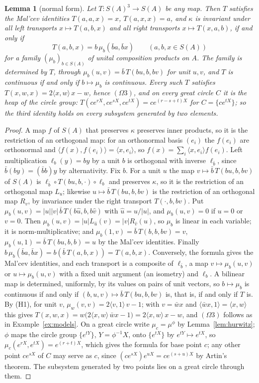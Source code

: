 \documentclass[11pt,reqno]{amsart}
\newtheorem{lemma}[theorem]{Lemma}
\theoremstyle{definition}
\theoremstyle{remark}
\numberwithin{equation}{section}
\newcommand{\ip}[2]{\langle #1,#2\rangle}
\begin{document}
\begin{lemma}[normal form]\label{lem:normal}
Let $T\colon S(A)^3\to S(A)$ be any map.  Then $T$ satisfies the Mal'cev identities $T(a,a,x)=x$, $T(a,x,x)=a$, and $\kappa$ is
invariant under all left transports $x\mapsto T(a,b,x)$ and all right transports $x\mapsto T(x,a,b)$, if and only if
\[
T(a,b,x)=b\,\mu_b(\bar ba,\bar bx)\qquad(a,b,x\in S(A))
\]
for a family $(\mu_b)_{b\in S(A)}$ of unital composition products on $A$.  The family is determined by $T$, through
$\mu_b(u,v)=\bar b\,T(bu,b,bv)$ for unit $u,v$, and $T$ is continuous if and only if $b\mapsto\mu_b$ is continuous.  Every such $T$
satisfies $T(x,w,x)=2\ip xw\,x-w$, hence $(\Omega3)$, and on every great circle $C$ it is the heap of the circle group:
$T(ce^{rX},ce^{sX},ce^{tX})=ce^{(r-s+t)X}$ for $C=\{ce^{tX}\}$; so the third identity holds on every subsystem generated by two
elements.
\end{lemma}
\begin{proof}
A map $f$ of $S(A)$ that preserves $\kappa$ preserves inner products, so it is the restriction of an orthogonal map: for an orthonormal
basis $(e_i)$ the $f(e_i)$ are orthonormal and $\ip{f(x)}{f(e_i)}=\ip x{e_i}$, so $f(x)=\sum_i\ip x{e_i}f(e_i)$.  Left multiplication
$\ell_b(y)=by$ by a unit $b$ is orthogonal with inverse $\ell_{\bar b}$, since $\bar b(by)=(\bar bb)y$ by alternativity.  Fix $b$.  For a unit $u$
the map $v\mapsto\bar b\,T(bu,b,bv)$ of $S(A)$ is $\ell_{\bar b}\circ T(bu,b,\cdot)\circ\ell_b$ and preserves $\kappa$, so it is the restriction of
an orthogonal map $L_u$; likewise $u\mapsto\bar b\,T(bu,b,bv)$ is the restriction of an orthogonal map $R_v$, by invariance under the
right transport $T(\cdot,b,bv)$.  Put $\mu_b(u,v)=\lvert u\rvert\lvert v\rvert\,\bar b\,T(b\hat u,b,b\hat v)$ with $\hat u=u/\lvert u\rvert$, and
$\mu_b(u,v)=0$ if $u=0$ or $v=0$.  Then $\mu_b(u,v)=\lvert u\rvert L_{\hat u}(v)=\lvert v\rvert R_{\hat v}(u)$, so $\mu_b$ is linear in each
variable; it is norm-multiplicative; and $\mu_b(1,v)=\bar b\,T(b,b,bv)=v$, $\mu_b(u,1)=\bar b\,T(bu,b,b)=u$ by the Mal'cev identities.
Finally $b\,\mu_b(\bar ba,\bar bx)=b(\bar b\,T(a,b,x))=T(a,b,x)$.  Conversely, the formula gives the Mal'cev identities, and each transport is a
composite of $\ell_{\bar b}$, a map $v\mapsto\mu_b(u,v)$ or $u\mapsto\mu_b(u,v)$ with a fixed unit argument (an isometry) and $\ell_b$.  A
bilinear map is determined, uniformly, by its values on pairs of unit vectors, so $b\mapsto\mu_b$ is continuous if and only if
$(b,u,v)\mapsto\bar b\,T(bu,b,bv)$ is, that is, if and only if $T$ is.  By (H1), for unit $v$, $\mu_w(v,v)=2\ip v1\,v-1$; with $v=\bar wx$ and
$\ip{\bar wx}1=\ip xw$ this gives $T(x,w,x)=w\bigl(2\ip xw\,\bar wx-1\bigr)=2\ip xw\,x-w$, and $(\Omega3)$ follows as in
Example~\ref{ex:models}.  On a great circle write $\mu_c=\mu^\phi$ by Lemma~\ref{lem:hurwitz}; $\phi$ maps the circle group $\{e^{tY}\}$,
$Y=\phi^{-1}X$, onto $\{e^{tX}\}$ by $e^{tY}\mapsto e^{tX}$, so $\mu_c(e^{rX},e^{tX})=e^{(r+t)X}$, which gives the formula for base
point $c$; any other point $ce^{sX}$ of $C$ may serve as $c$, since $(ce^{sX})e^{uX}=ce^{(s+u)X}$ by Artin's theorem.  The subsystem generated by two points lies on a great circle through them.
\end{proof}
\end{document}
